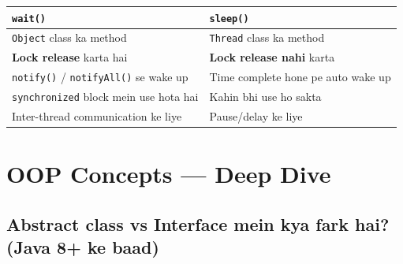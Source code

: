\documentclass[12pt,a4paper]{article}
\begin{document}
\begin{answerbox}
\begin{center}
\begin{tabular}{p{6cm} p{6cm}}
\toprule
\textbf{\texttt{wait()}} & \textbf{\texttt{sleep()}} \\
\midrule
\texttt{Object} class ka method & \texttt{Thread} class ka method \\
\textbf{Lock release} karta hai & \textbf{Lock release nahi} karta \\
\texttt{notify()} / \texttt{notifyAll()} se wake up & Time complete hone pe auto wake up \\
\texttt{synchronized} block mein use hota hai & Kahin bhi use ho sakta \\
Inter-thread communication ke liye & Pause/delay ke liye \\
\bottomrule
\end{tabular}
\end{center}
\end{answerbox}

\section{OOP Concepts --- Deep Dive}

\setcounter{subsection}{56}

\subsection{Abstract class vs Interface mein kya fark hai? (Java 8+ ke baad)}
\end{document}
